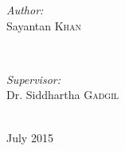 \documentclass[12pt, titlepage]{article}
\theoremstyle{definition}
\begin{document}
\begin{titlepage}

\begin{minipage}{0.4\textwidth}
\begin{flushleft} \large
\emph{Author:}\\
Sayantan \textsc{Khan} %
\end{flushleft}
\end{minipage}
~
\begin{minipage}{0.4\textwidth}
\begin{flushright} \large
\emph{Supervisor:} \\
Dr. Siddhartha \textsc{Gadgil} %
\end{flushright}
\end{minipage}\\[2cm]



{\large July 2015}\\[2cm] %



\vfill %

\end{titlepage}


\vspace*{3.5cm}
\end{document}
